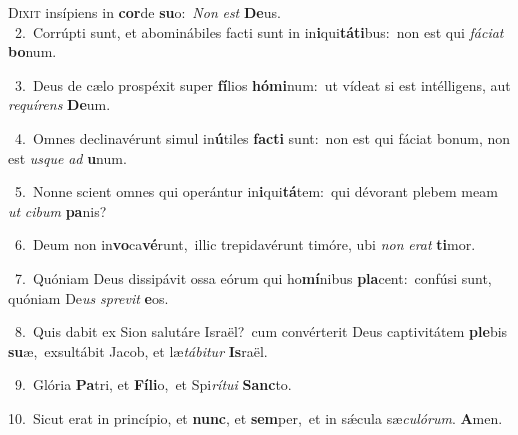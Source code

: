 \lettrine{\initial\textcolor{\initialcolor}{D}}{ixit} insípiens in \textbf{cor}\-de \textbf{su}\-o:~\star \textit{Non} \textit{est} \textbf{De}\-us.\\
{\numbfont\textcolor{\numbcolor}{~2.}}~Corrúpti sunt, et abominábiles facti sunt in in\-\textbf{i}\-qui\-\textbf{tá}\-\textbf{ti}bus:~\star non est qui \textit{fá}\-\textit{ci}\textit{at} \textbf{bo}\-num.\par
{\numbfont\textcolor{\numbcolor}{~3.}}~Deus de cælo prospéxit super \textbf{fí}\-lios \textbf{hó}\-\textbf{mi}num:~\star ut vídeat si est intélligens, aut \textit{re}\-\textit{quí}\textit{rens} \textbf{De}\-um.\par
{\numbfont\textcolor{\numbcolor}{~4.}}~Omnes declinavérunt simul in\-\textbf{ú}\-tiles \textbf{fac}\-\textbf{ti} sunt:~\star non est qui fáciat bonum, non est \textit{us}\-\textit{que} \textit{ad} \textbf{u}\-num.\par
{\numbfont\textcolor{\numbcolor}{~5.}}~Nonne scient omnes qui operántur in\-\textbf{i}\-qui\-\textbf{tá}\-tem:~\star qui dévorant plebem meam \textit{ut} \textit{ci}\-\textit{bum} \textbf{pa}\-nis?\par
{\numbfont\textcolor{\numbcolor}{~6.}}~Deum non in\-\textbf{vo}\-ca\-\textbf{vé}\-runt,~\star illic trepidavérunt timóre, ubi \textit{non} \textit{e}\-\textit{rat} \textbf{ti}\-mor.\par
{\numbfont\textcolor{\numbcolor}{~7.}}~Quóniam Deus dissipávit ossa eórum qui ho\-\textbf{mí}\-nibus \textbf{pla}\-cent:~\star confúsi sunt, quóniam De\textit{us} \textit{spre}\-\textit{vit} \textbf{e}\-os.\par
{\numbfont\textcolor{\numbcolor}{~8.}}~Quis dabit ex Sion salutáre Israël?~\dagger cum convérterit Deus captivitátem \textbf{ple}\-bis \textbf{su}\-æ,~\star exsultábit Jacob, et læ\-\textit{tá}\-\textit{bi}\textit{tur} \textbf{Is}\-raël.\par
{\numbfont\textcolor{\numbcolor}{~9.}}~Glória \textbf{Pa}\-tri, et \textbf{Fí}\-\textbf{li}o,~\star et Spi\-\textit{rí}\-\textit{tu}\textit{i} \textbf{Sanc}\-to.\par
{\numbfont\textcolor{\numbcolor}{10.}}~Sicut erat in princípio, et \textbf{nunc}\-, et \textbf{sem}\-per,~\star et in sǽcula sæ\-\textit{cu}\-\textit{ló}\textit{rum}. \textbf{A}\-men.\par
